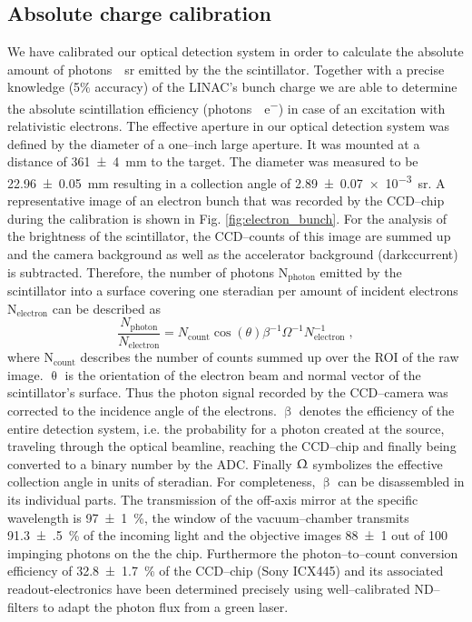 \documentclass[%
reprint,
amsmath,
amssymb,
aip,
rsi, 
numerical,
floatfix,
]{revtex4-1}
\begin{document}
\subsection{\label{Ac} Absolute charge calibration}
We have calibrated our optical detection system in order to calculate the absolute amount of \si[per-mode=symbol]{photons \per \steradian}  emitted by the the scintillator.
Together with a precise knowledge (5$\%$ accuracy) of the LINAC's bunch charge we are able to determine the absolute scintillation efficiency (\si[per-mode=symbol]{photons \per e^-}) in case of an excitation with relativistic electrons.
The effective aperture in our optical detection system was defined by the diameter of a one--inch large aperture.
It was mounted at a distance of \SI[separate-uncertainty = true]{361(4)}{\milli\metre} to the target.
The diameter was measured to be \SI[separate-uncertainty = true]{22.96(5)}{\milli\metre} resulting in a collection angle of \SI[separate-uncertainty = true]{2.89(7)e-3}{\steradian}.
A representative image of an electron bunch that was recorded by the CCD--chip during the calibration is shown in Fig. \ref{fig:electron_bunch}. For the analysis of the brightness of the scintillator, the CCD--counts of this image are summed up and the camera background as well as the accelerator background (darkccurrent) is subtracted. 
Therefore, the number of photons N$_{\text{photon}}$ emitted by the scintillator into a surface covering one steradian per amount of incident electrons N$_{\text{electron}}$ can be described as
\begin{equation}
\frac{N_{\text{photon}}}{N_{\text{electron}}} = N_{\text{count}}\cos(\theta)\beta^{-1}\Omega^{-1}N_{\text{electron}}^{-1}{\;,}
\label{eq:ac}
\end{equation}
where N$_{\text{count}}$ describes the number of counts summed up over the ROI of the raw image.
$\uptheta$ is the orientation of the electron beam and normal vector of the scintillator's surface.
Thus the photon signal recorded by the CCD--camera was corrected to the incidence angle of the electrons.
$\upbeta$ denotes the efficiency of the entire detection system, i.e. the probability for a photon created at the source, traveling through the optical beamline, reaching the CCD--chip and finally being converted to a binary number by the ADC.
Finally $\Upomega$ symbolizes the effective collection angle in units of steradian.
For completeness, $\upbeta$ can be disassembled in its individual parts. 
The transmission of the off-axis mirror at the specific wavelength is \SI[separate-uncertainty = true]{97(1)}{\%}, the window of the vacuum--chamber transmits \SI[separate-uncertainty = true]{91.3(5)}{\%} of the incoming light and the objective images \num[separate-uncertainty = true]{88(1)} out of 100 impinging photons on the the chip.
Furthermore the photon--to--count conversion efficiency of \SI[separate-uncertainty = true]{32.8(17)}{\%} of the CCD--chip (Sony ICX445) and its associated readout-electronics have been determined precisely using well--calibrated ND--filters to adapt the photon flux from a green laser.  
\end{document}
